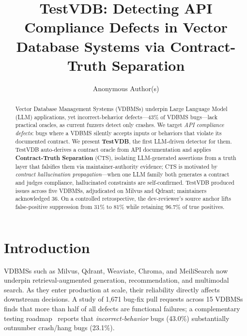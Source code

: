 \documentclass[sigconf]{acmart}
\begin{document}
\title{TestVDB: Detecting API Compliance Defects in Vector Database Systems via Contract-Truth Separation}

\author{Anonymous Author(s)}



\begin{abstract}
Vector Database Management Systems (VDBMSs) underpin Large Language Model (LLM) applications, yet incorrect-behavior defects---43\% of VDBMS bugs---lack practical oracles, as current fuzzers detect only crashes. We target \emph{API compliance defects}: bugs where a VDBMS silently accepts inputs or behaviors that violate its documented contract. We present \textbf{TestVDB}, the first LLM-driven detector for them. TestVDB auto-derives a contract oracle from API documentation and applies \textbf{Contract-Truth Separation} (CTS), isolating LLM-generated assertions from a truth layer that falsifies them via maintainer-authority evidence; CTS is motivated by \emph{contract hallucination propagation}---when one LLM family both generates a contract and judges compliance, hallucinated constraints are self-confirmed. TestVDB produced issues across five VDBMSs, adjudicated on Milvus and Qdrant; maintainers acknowledged 36. On a controlled retrospective, the dev-reviewer's source anchor lifts false-positive suppression from 31\% to 81\% while retaining 96.7\% of true positives.
\end{abstract}

\maketitle

\section{Introduction}\label{sec:intro}

VDBMSs such as Milvus, Qdrant, Weaviate, Chroma, and MeiliSearch now underpin retrieval-augmented generation, recommendation, and multimodal search. As they enter production at scale, their reliability directly affects downstream decisions. A study of 1{,}671 bug-fix pull requests across 15 VDBMSs~\cite{bugstudy25} finds that more than half of all defects are functional failures; a complementary testing roadmap~\cite{roadmap25} reports that \emph{incorrect-behavior} bugs (43.0\%) substantially outnumber crash/hang bugs (23.1\%).
\end{document}
